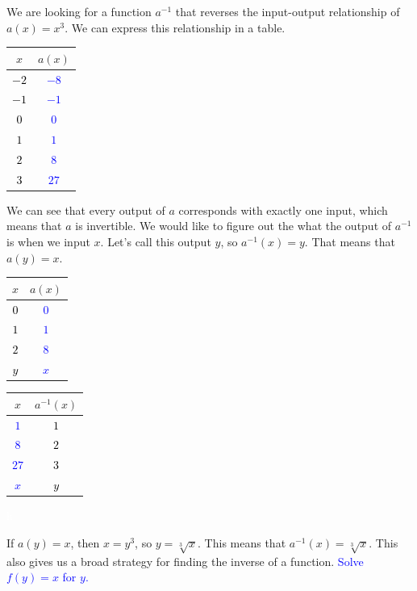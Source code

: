 \documentclass{article}
\begin{document}
\begin{enumerate}
\begin{enumerate}
    \begin{solution}
       We are looking for a function $a^{-1}$ that reverses the input-output
       relationship of $a(x) = x^3$. We can express this relationship in a table.
        \begin{center}
          \begin{tabular} {c|c} 
            $x$ & $a(x)$ \\ \hline
            \textcolor{black}{$-2$ }&\textcolor{blue}{$-8$} \\
            \textcolor{black}{$-1$ }&\textcolor{blue}{$-1$} \\
            \textcolor{black}{$0$ }&\textcolor{blue}{$0$} \\
            \textcolor{black}{$1$ }&\textcolor{blue}{$1$} \\
            \textcolor{black}{$2$ }&\textcolor{blue}{$8$}\\ 
            \textcolor{black}{$3$ }&\textcolor{blue}{$27$}\\ 
          \end{tabular}
        \end{center} 
        We can see that every output of $a$ corresponds with exactly one input, which
        means that $a$ is invertible. We would like to figure out the what the output of $a^{-1} $ is when we input $x$. Let's call this output $y$, so $a^{-1}(x)=y$. That means that $a(y)=x$.
        \begin{center} \hfill 
          \begin{tabular} {c|c} 
            $x$ & $a(x)$ \\ \hline
            \textcolor{black}{$0$ }&\textcolor{blue}{$0$} \\
            \textcolor{black}{$1$ }&\textcolor{blue}{$1$} \\
            \textcolor{black}{$2$ }&\textcolor{blue}{$8$}\\ 
            \textcolor{black}{$y$ }&\textcolor{blue}{$x$} \\ 
          \end{tabular} \hfill \begin{tabular} {c|c} 
            $x$ & $a^{-1}(x)$ \\ \hline 
            \textcolor{blue}{$1$} & \textcolor{black}{$1$} \\
            \textcolor{blue}{$8$} & \textcolor{black}{$2$}\\ 
            \textcolor{blue}{$27$} & \textcolor{black}{$3$}\\ 
            \textcolor{blue}{$x$}& \textcolor{black}{$y$}\\
          \end{tabular} \hfill 
          \textcolor{white}{h} 
        \end{center}
        If $a(y)=x$, then $x=y^3$, so
        $y=\sqrt[3]{x}$.
        This means that $a^{-1}(x) = \sqrt[3]{x}$. This also gives us a broad strategy for finding the inverse of a function. \textcolor{blue}{Solve $f(y) =x$ for $y$.} 


\end{solution}
\end{enumerate}
\end{enumerate}
\end{document}
